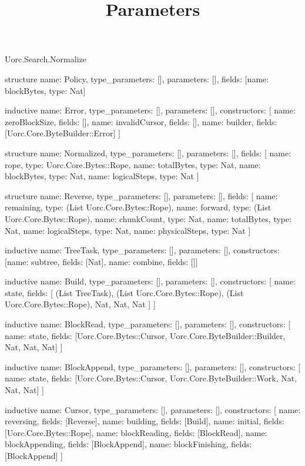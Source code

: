 \begin{lexlean}{Uorc.Search.Normalize}
\title{Parameters}
\begin{semanticmodule}
structure{
  name: Policy,
  type_parameters: [],
  parameters: [],
  fields: [{name: blockBytes, type: Nat}]
}

inductive{
  name: Error,
  type_parameters: [],
  parameters: [],
  constructors: [
    {name: zeroBlockSize, fields: []},
    {name: invalidCursor, fields: []},
    {name: builder, fields: [Uorc.Core.ByteBuilder::Error]}
  ]
}

structure{
  name: Normalized,
  type_parameters: [],
  parameters: [],
  fields: [
    {name: rope, type: Uorc.Core.Bytes::Rope},
    {name: totalBytes, type: Nat},
    {name: blockBytes, type: Nat},
    {name: logicalSteps, type: Nat}
  ]
}

structure{
  name: Reverse,
  type_parameters: [],
  parameters: [],
  fields: [
    {name: remaining, type: (List Uorc.Core.Bytes::Rope)},
    {name: forward, type: (List Uorc.Core.Bytes::Rope)},
    {name: chunkCount, type: Nat},
    {name: totalBytes, type: Nat},
    {name: logicalSteps, type: Nat},
    {name: physicalSteps, type: Nat}
  ]
}

inductive{
  name: TreeTask,
  type_parameters: [],
  parameters: [],
  constructors: [{name: subtree, fields: [Nat]}, {name: combine, fields: []}]
}

inductive{
  name: Build,
  type_parameters: [],
  parameters: [],
  constructors: [
    {
      name: state,
      fields: [
        (List TreeTask),
        (List Uorc.Core.Bytes::Rope),
        (List Uorc.Core.Bytes::Rope),
        Nat,
        Nat,
        Nat
      ]
    }
  ]
}

inductive{
  name: BlockRead,
  type_parameters: [],
  parameters: [],
  constructors: [
    {name: state, fields: [Uorc.Core.Bytes::Cursor, Uorc.Core.ByteBuilder::Builder, Nat, Nat, Nat]}
  ]
}

inductive{
  name: BlockAppend,
  type_parameters: [],
  parameters: [],
  constructors: [
    {name: state, fields: [Uorc.Core.Bytes::Cursor, Uorc.Core.ByteBuilder::Work, Nat, Nat, Nat]}
  ]
}

inductive{
  name: Cursor,
  type_parameters: [],
  parameters: [],
  constructors: [
    {name: reversing, fields: [Reverse]},
    {name: building, fields: [Build]},
    {name: initial, fields: [Uorc.Core.Bytes::Rope]},
    {name: blockReading, fields: [BlockRead]},
    {name: blockAppending, fields: [BlockAppend]},
    {name: blockFinishing, fields: [BlockAppend]}
  ]
}


\end{semanticmodule}
\end{lexlean}
